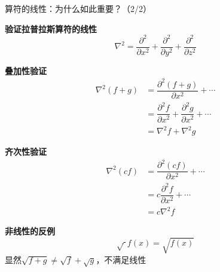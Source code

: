 \begin{frame}{算符的线性：为什么如此重要？（2/2）}
  
    \begin{iqbitemize}
      \item \textbf{验证拉普拉斯算符的线性}
      \[
        \nabla^2 = \dfrac{\partial^2}{\partial x^2} + \dfrac{\partial^2}{\partial y^2} + \dfrac{\partial^2}{\partial z^2}
      \]

      \item \textbf{叠加性验证}
      \begin{align*}
        \nabla^2(f+g) &= \dfrac{\partial^2(f+g)}{\partial x^2} + \cdots \\
                  &= \dfrac{\partial^2 f}{\partial x^2} + \dfrac{\partial^2 g}{\partial x^2} + \cdots \\
                  &= \nabla^2 f + \nabla^2 g
      \end{align*}

      \item \textbf{齐次性验证}
      \begin{align*}
        \nabla^2(cf) &= \dfrac{\partial^2(cf)}{\partial x^2} + \cdots \\
                 &= c\dfrac{\partial^2 f}{\partial x^2} + \cdots \\
                 &= c\nabla^2 f
      \end{align*}

      \item \textbf{非线性的反例}
      \[
        \sqrt{\hat{\ }}f(x) = \sqrt{f(x)}
      \]
      显然$\sqrt{f+g} \neq \sqrt{f} + \sqrt{g}$，不满足线性
    \end{iqbitemize}
  

\end{frame}

